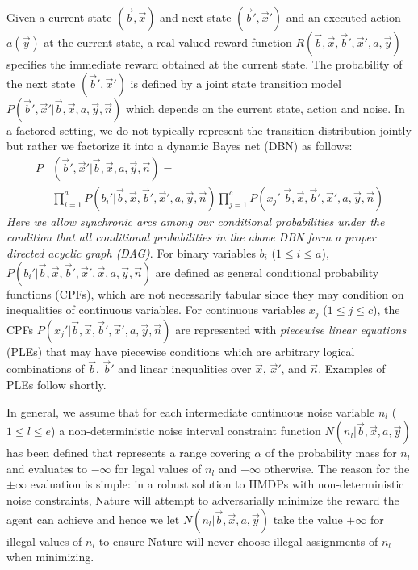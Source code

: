 \documentclass[letterpaper]{article}
\begin{document}
Given a current state $(\vec{b},\vec{x})$ and next state
$(\vec{b}',\vec{x}')$ and an executed action $a(\vec{y})$ 
at the current state, a real-valued reward function $R(\vec{b},\vec{x},\vec{b}',\vec{x}',a,\vec{y})$
specifies the immediate reward obtained at the current state. The probability of the
next state $(\vec{b}',\vec{x}')$ is defined by a joint state
transition model
$P(\vec{b}',\vec{x}'| \vec{b},\vec{x},a,\vec{y},\vec{n})$ which
depends on the current state, action and noise.
In a factored setting, we do not typically represent the transition
distribution jointly but rather we factorize it into a
dynamic Bayes net (DBN) as follows: %
{\footnotesize
\begin{align}
P&(\vec{b}',\vec{x}'|\vec{b},\vec{x}, a,\vec{y},\vec{n}) = \nonumber  \\
& \prod_{i=1}^a P(b_i'|\vec{b},\vec{x},\vec{b}',\vec{x}',a,\vec{y},\vec{n}) 
  \prod_{j=1}^c P(x_j'|\vec{b},\vec{x},\vec{b}',\vec{x}',a,\vec{y},\vec{n})
\end{align}
}
\emph{Here we allow synchronic arcs among our conditional probabilities 
under the condition that all conditional probabilities in the above DBN form 
a proper directed acyclic graph (DAG)}.
For binary variables $b_i$ ($1 \leq i \leq a$),
$P(b_i'|\vec{b},\vec{x},\vec{b}',\vec{x}',\vec{x},a,\vec{y},\vec{n})$ are defined as
general conditional probability functions (CPFs), which are not necessarily tabular
since they may condition on inequalities of continuous variables.  For
continuous variables $x_j$ ($1 \leq j \leq c$), the CPFs
$P(x_j'|\vec{b},\vec{x},\vec{b}',\vec{x}',a,\vec{y},\vec{n})$ are represented
with \emph{piecewise linear equations} (PLEs) that may have piecewise 
conditions which are arbitrary logical combinations of
$\vec{b}$, $\vec{b}'$ and linear inequalities over $\vec{x}$, $\vec{x}'$,
and $\vec{n}$.  Examples of PLEs follow shortly.

In general, we assume that for each intermediate continuous noise variable 
$n_l$ ($1 \leq l \leq e$)
a non-deterministic noise interval constraint function $N(n_l| \vec{b},\vec{x},a,\vec{y})$ 
has been defined 
that represents a range covering $\alpha$ of the probability mass for $n_l$ and evaluates to 
$-\infty$ for legal values of $n_l$ and $+\infty$ otherwise.  The reason for
the $\pm \infty$ evaluation is simple: 
in a robust solution to HMDPs with non-deterministic noise constraints, Nature will
attempt to adversarially minimize the reward the agent can achieve and hence we let
$N(n_l| \vec{b},\vec{x},a,\vec{y})$ take the value $+\infty$ for illegal values
of $n_l$ to ensure Nature will never choose illegal assignments of $n_l$ when minimizing.
\end{document}

